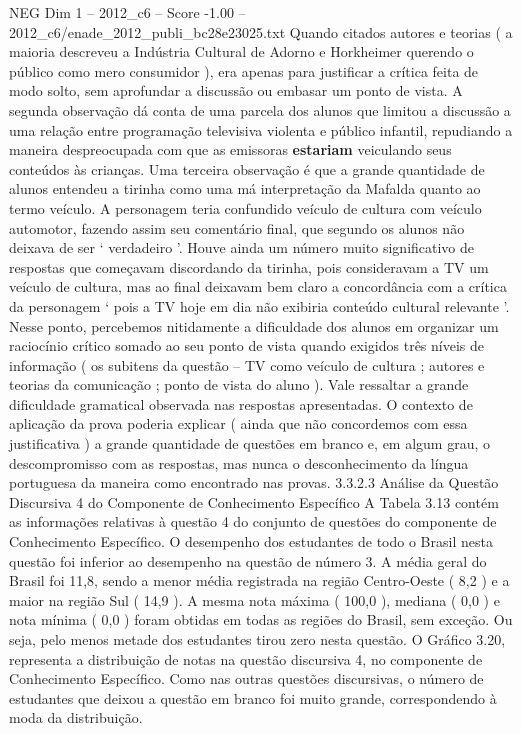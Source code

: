 \begin{textsample}{NEG Dim 1 – 2012\_c6 – Score -1.00 – 2012\_c6/enade\_2012\_publi\_bc28e23025.txt}
Quando citados autores e teorias ( a maioria descreveu a Indústria Cultural de Adorno e Horkheimer querendo o público como mero consumidor ), era apenas para justificar a crítica feita de modo solto, sem aprofundar a discussão ou embasar um ponto de vista.
A segunda observação dá conta de uma parcela dos alunos que limitou a discussão a uma relação entre programação televisiva violenta e público infantil, repudiando a maneira despreocupada com que as emissoras \textbf{estariam} veiculando seus conteúdos às crianças.
Uma terceira observação é que a grande quantidade de alunos entendeu a tirinha como uma má interpretação da Mafalda quanto ao termo veículo.
A personagem teria confundido veículo de cultura com veículo automotor, fazendo assim seu comentário final, que segundo os alunos não deixava de ser ‘ verdadeiro ’.
Houve ainda um número muito significativo de respostas que começavam discordando da tirinha, pois consideravam a TV um veículo de cultura, mas ao final deixavam bem claro a concordância com a crítica da personagem ‘ pois a TV hoje em dia não exibiria conteúdo cultural relevante ’.
Nesse ponto, percebemos nitidamente a dificuldade dos alunos em organizar um raciocínio crítico somado ao seu ponto de vista quando exigidos três níveis de informação ( os subitens da questão – TV como veículo de cultura ; autores e teorias da comunicação ; ponto de vista do aluno ).
Vale ressaltar a grande dificuldade gramatical observada nas respostas apresentadas.
O contexto de aplicação da prova poderia explicar ( ainda que não concordemos com essa justificativa ) a grande quantidade de questões em branco e, em algum grau, o descompromisso com as respostas, mas nunca o desconhecimento da língua portuguesa da maneira como encontrado nas provas. 3.3.2.3 Análise da Questão Discursiva 4 do Componente de Conhecimento Específico A Tabela 3.13 contém as informações relativas à questão 4 do conjunto de questões do componente de Conhecimento Específico.
O desempenho dos estudantes de todo o Brasil nesta questão foi inferior ao desempenho na questão de número 3.
A média geral do Brasil foi 11,8, sendo a menor média registrada na região Centro-Oeste ( 8,2 ) e a maior na região Sul ( 14,9 ).
A mesma nota máxima ( 100,0 ), mediana ( 0,0 ) e nota mínima ( 0,0 ) foram obtidas em todas as regiões do Brasil, sem exceção.
Ou seja, pelo menos metade dos estudantes tirou zero nesta questão.
O Gráfico 3.20, representa a distribuição de notas na questão discursiva 4, no componente de Conhecimento Específico.
Como nas outras questões discursivas, o número de estudantes que deixou a questão em branco foi muito grande, correspondendo à moda da distribuição.

\end{textsample}

